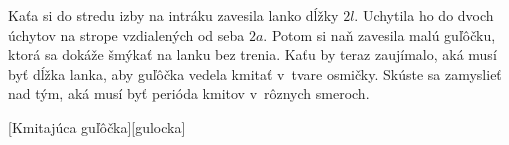 Kaťa si do stredu izby na intráku zavesila lanko dĺžky $2l$. Uchytila ho do dvoch úchytov na strope vzdialených od seba $2a$.
Potom si naň zavesila malú guľôčku, ktorá sa dokáže šmýkať na lanku bez trenia.
Kaťu by teraz zaujímalo, aká musí byť dĺžka lanka, aby guľôčka vedela kmitať v~tvare osmičky.
Skúste sa zamyslieť nad tým, aká musí byť perióda kmitov v~rôznych smeroch.

[Kmitajúca guľôčka][gulocka]
